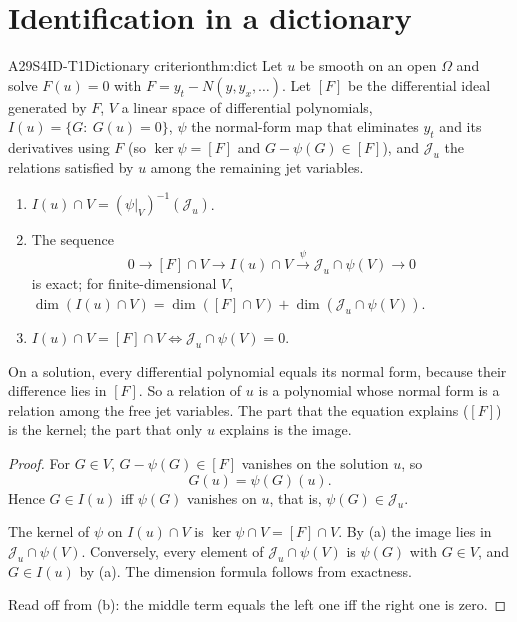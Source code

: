 \section{Identification in a dictionary}

\begin{dimcard}{A29}{S4ID-T1}{Dictionary criterion}{\proved}{thm:dict}
Let $u$ be smooth on an open $\Omega$ and solve $F(u)=0$ with $F=y_t-N(y,y_x,\dots)$. Let $[F]$ be the differential ideal generated by $F$, $V$ a linear space of differential polynomials, $I(u)=\{G:\ G(u)=0\}$, $\psi$ the normal-form map that eliminates $y_t$ and its derivatives using $F$ (so $\ker\psi=[F]$ and $G-\psi(G)\in[F]$), and $\mathcal J_u$ the relations satisfied by $u$ among the remaining jet variables.
\begin{enumerate}[label=(\alph*)]
\item $I(u)\cap V=(\psi|_V)^{-1}(\mathcal J_u)$.
\item The sequence
\[
0\to[F]\cap V\to I(u)\cap V\xrightarrow{\ \psi\ }\mathcal J_u\cap\psi(V)\to0
\]
is exact; for finite-dimensional $V$, $\dim(I(u)\cap V)=\dim([F]\cap V)+\dim(\mathcal J_u\cap\psi(V))$.
\item $I(u)\cap V=[F]\cap V\iff\mathcal J_u\cap\psi(V)=0$.
\end{enumerate}
\end{dimcard}

\begin{proofidea}
On a solution, every differential polynomial equals its normal form, because their difference lies in $[F]$. So a relation of $u$ is a polynomial whose normal form is a relation among the free jet variables. The part that the equation explains ($[F]$) is the kernel; the part that only $u$ explains is the image.
\end{proofidea}

\begin{proof}
For $G\in V$, $G-\psi(G)\in[F]$ vanishes on the solution $u$, so
\[
G(u)=\psi(G)(u).
\]
Hence $G\in I(u)$ iff $\psi(G)$ vanishes on $u$, that is, $\psi(G)\in\mathcal J_u$.

The kernel of $\psi$ on $I(u)\cap V$ is $\ker\psi\cap V=[F]\cap V$. By (a) the image lies in $\mathcal J_u\cap\psi(V)$. Conversely, every element of $\mathcal J_u\cap\psi(V)$ is $\psi(G)$ with $G\in V$, and $G\in I(u)$ by (a). The dimension formula follows from exactness.

Read off from (b): the middle term equals the left one iff the right one is zero.

\end{proof}


